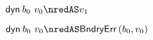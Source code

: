{\begin{lamportproof*}
    \begin{pfproof}
      \qedstep
        \begin{pfproof}
          $\edynb{\sbnd_0}{\svalue_0} \nredAS \svalue_1$
        \end{pfproof}
    \end{pfproof}

    \begin{pfproof}
      \qedstep
        \begin{pfproof}
          $\edynb{\sbnd_0}{\svalue_0} \nredAS \boundaryerror{\sbnd_0}{\svalue_0}$
        \end{pfproof}
    \end{pfproof}

\end{lamportproof*}}

